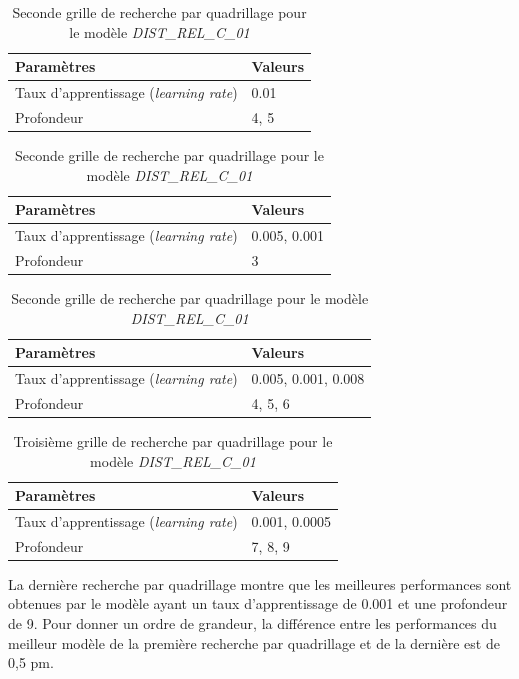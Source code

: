 \begin{table}
	\centering
	
	\begin{tabular}{|l|l|}
		\hline
		\textbf{Paramètres} & \textbf{Valeurs} \\ \hline 
		Taux d'apprentissage (\emph{learning rate}) & 0.01\\ \hline
		Profondeur & 4, 5 \\ \hline
	\end{tabular}	
	
	\vspace{0.5cm}	
	
	\begin{tabular}{|l|l|}
		\hline
		\textbf{Paramètres} & \textbf{Valeurs} \\ \hline 
		Taux d'apprentissage (\emph{learning rate})& 0.005, 0.001\\ \hline
		Profondeur & 3 \\ \hline
	\end{tabular}
	
	\vspace{0.5cm}	

	\begin{tabular}{|l|l|}
		\hline
		\textbf{Paramètres} & \textbf{Valeurs} \\ \hline 
		Taux d'apprentissage (\emph{learning rate})& 0.005, 0.001, 0.008\\ \hline
		Profondeur & 4, 5, 6 \\ \hline
	\end{tabular}		
	\caption{Seconde grille de recherche par quadrillage pour le modèle \emph{DIST\_REL\_C\_01}}
	\label{t_grille_quadri2_dist_rel_c_01}
\end{table}
              
\begin{table}
	\centering
	\begin{tabular}{|l|l|}
		\hline
		\textbf{Paramètres} & \textbf{Valeurs} \\ \hline 
		Taux d'apprentissage (\emph{learning rate}) & 0.001, 0.0005\\ \hline
		Profondeur & 7, 8, 9\\ \hline
	\end{tabular}	
	
	\caption{Troisième grille de recherche par quadrillage pour le modèle \emph{DIST\_REL\_C\_01}}
	\label{t_grille_quadri3_dist_rel_c_01}

\end{table}

\par La dernière recherche par quadrillage montre que les meilleures performances sont obtenues par le modèle ayant un taux d'apprentissage de 0.001 et une profondeur de 9. Pour donner un ordre de grandeur, la différence entre les performances du meilleur modèle de la première recherche par quadrillage et de la dernière est de 0,5 pm.


